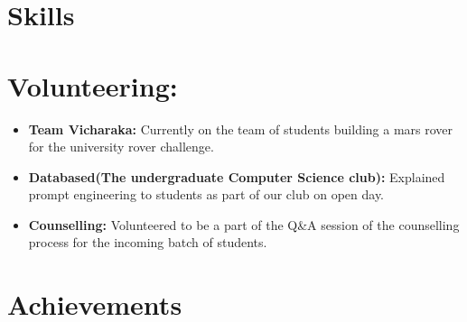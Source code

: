 \documentclass[11pt,a4paper,sans]{moderncv}
\begin{document}
\section{Skills}
\section{Volunteering:}
\begin{itemize}
  \item \textbf{Team Vicharaka:} Currently on the team of students building a mars rover for the university rover challenge.
  \item \textbf{Databased(The undergraduate Computer Science club):} Explained prompt engineering to students as part of our club on open day. 
  \item \textbf{Counselling:} Volunteered to be a part of the Q\&A session of the counselling process for the incoming batch of students.
\end{itemize}

\section{Achievements}
\end{document}
